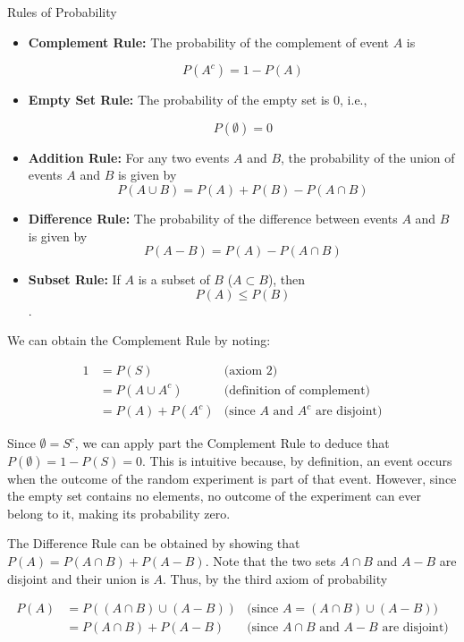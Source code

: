 \begin{theorem}{Rules of Probability}
    \begin{itemize}
        \item \textbf{Complement Rule:} The probability of the complement of event $A$ is

        \[
        P(A^c) = 1 - P(A)
        \]

        \item \textbf{Empty Set Rule:} The probability of the empty set is 0, i.e.,

        \[P(\emptyset) = 0\]

        \item \textbf{Addition Rule:} For any two events $A$ and $B$, the probability of the union of events $A$ and $B$ is given by
        \[
        P(A \cup B) = P(A) + P(B) - P(A \cap B)
        \]

        \item \textbf{Difference Rule:} The probability of the difference between events $A$ and $B$ is given by
        \[
        P(A-B)=P(A)-P(A \cap B)
        \]
        \item \textbf{Subset Rule:} If $A$ is a subset of $B$ ($A \subset B$), then
        \[P(A) \leq P(B)\].
    \end{itemize}
\end{theorem}

We can obtain the Complement Rule by noting:

\begin{align*}
    1 &= P(S) & \text{(axiom 2)} \\
      &= P(A \cup A^c) & \text{(definition of complement)} \\
      &= P(A) + P(A^c) & \text{(since } A \text{ and } A^c \text{ are disjoint)}
\end{align*}

Since $\emptyset=S^c$, we can apply part the Complement Rule to deduce that $P(\emptyset)=1-P(S)=0$. This is intuitive because, by definition, an event occurs when the outcome of the random experiment is part of that event. However, since the empty set contains no elements, no outcome of the experiment can ever belong to it, making its probability zero.

The Difference Rule can be obtained by showing that $P(A)=P(A \cap B)+P(A-B)$. Note that the two sets $A \cap B$ and $A-B$ are disjoint and their union is $A$. Thus, by the third axiom of probability

\begin{align*}
    P(A) &= P\left((A \cap B) \cup (A - B)\right) & \text{(since } A = (A \cap B) \cup (A - B)) \\
         &= P(A \cap B) + P(A - B) & \text{(since } A \cap B \text{ and } A - B \text{ are disjoint)}
    \end{align*}


